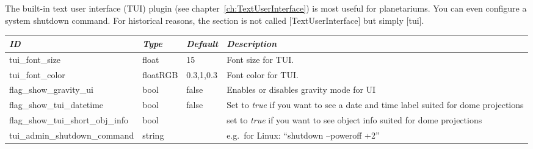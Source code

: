 \section{}\label{section-tui}

The built-in text user interface (TUI) plugin (see chapter~\ref{ch:TextUserInterface}) is most useful for planetariums. You can even configure a system shutdown command. 
For historical reasons, the section is not called [TextUserInterface] but simply [tui].

\begin{longtabu} to \textwidth {l|l|l|X}\toprule
\emph{ID} & \emph{Type} &\emph{Default}& \emph{Description}\\\midrule
tui\_font\_size           &float    &15       &Font size for TUI.\\\midrule
tui\_font\_color          &floatRGB &0.3,1,0.3&Font color for TUI.\\\midrule
flag\_show\_gravity\_ui   & bool    &false    & Enables or disables gravity mode for UI\\\midrule
flag\_show\_tui\_datetime & bool    &false    &Set to \emph{true} if you want to see a date and time label suited for dome projections\\\midrule
flag\_show\_tui\_short\_obj\_info   & bool&    &set to \emph{true} if you want to see object info suited for dome projections\\\midrule
tui\_admin\_shutdown\_command       & string  && e.g.\ for Linux: ``shutdown --poweroff +2'' \\\bottomrule
\end{longtabu}

\section{}\label{section-video}

